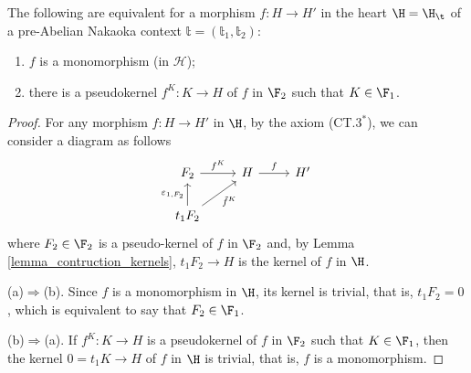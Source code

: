 \begin{prop}\label{prop:1.4}
The following are equivalent for a morphism $f\colon H\to H'$ in the heart $\H=\H_\t$ of a pre-Abelian Nakaoka context $\mathbb{t}=(\mathbb{t}_1,\mathbb{t}_2)$:
\begin{enumerate}[label=(\alph*)]
\item $f$ is a monomorphism (in $\mathcal{H}$);
\item there is a pseudokernel $f^K\colon K\to H$ of $f$ in $\F_2$ such that $K\in \F_1$. 
\end{enumerate}
\end{prop}
\begin{proof}
For any morphism $f\colon H\to H'$ in $\H$, by the axiom (CT.$3^*$), we can consider a diagram as follows
\begin{equation*}
\begin{tikzcd}
F_2\arrow{r}{f^K} & H\arrow{r}{f} & H'\\
t_1{F_2}\arrow{u}{\varepsilon_{1,F_2}}\arrow{ur}[']{\tilde{f}^K}
\end{tikzcd}
\end{equation*}
where $F_2\in \F_2$ is a pseudo-kernel of $f$ in $\F_2$ and, by Lemma \ref{lemma_contruction_kernels}, $t_1F_2\to H$ is the kernel of $f$ in $\H$.

\smallskip\noindent
(a)$\Rightarrow$(b). Since $f$ is a monomorphism in $\H$, its kernel is trivial, that is, $t_1F_2=0$, which is equivalent to say that $F_2\in \F_1$.

\smallskip\noindent
(b)$\Rightarrow$(a). If  $f^K\colon K\to H$ is a pseudokernel of $f$ in $\F_2$ such that $K\in \F_1$, then the kernel $0=t_1K\to H$ of $f$
 in $\H$ is trivial, that is, $f$ is a monomorphism.
\end{proof}







